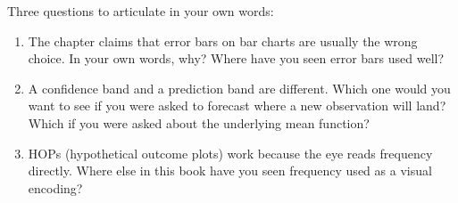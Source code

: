 \documentclass[
  letterpaper,
  11pt,
  twoside,
  openany]{scrbook}
\begin{document}
\begin{tcolorbox}[enhanced jigsaw, arc=.35mm, bottomrule=.15mm, bottomtitle=1mm, breakable, colback=white, colbacktitle=quarto-callout-caution-color!10!white, colframe=quarto-callout-caution-color-frame, coltitle=black, left=2mm, leftrule=.75mm, opacityback=0, opacitybacktitle=0.6, rightrule=.15mm, title=\textcolor{quarto-callout-caution-color}{\faFire}\hspace{0.5em}{Reflect before moving on}, titlerule=0mm, toprule=.15mm, toptitle=1mm]

Three questions to articulate in your own words:

\begin{enumerate}
\def\labelenumi{\arabic{enumi}.}
\item
  The chapter claims that error bars on bar charts are usually the wrong
  choice. In your own words, why? Where have you seen error bars used
  well?
\item
  A confidence band and a prediction band are different. Which one would
  you want to see if you were asked to forecast where a new observation
  will land? Which if you were asked about the underlying mean function?
\item
  HOPs (hypothetical outcome plots) work because the eye reads frequency
  directly. Where else in this book have you seen frequency used as a
  visual encoding?
\end{enumerate}

\end{tcolorbox}
\end{document}
